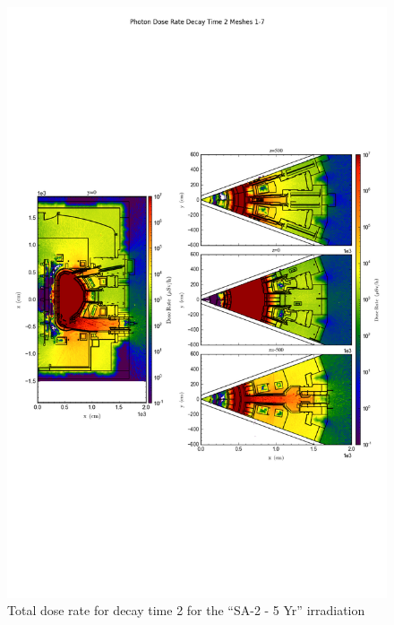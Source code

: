 \documentclass[12pt]{article}
\begin{document}
\begin{figure}[ht!]
\centering
\includegraphics[trim={0cm 8cm, 0cm 8cm},clip,scale=0.75]{../plots/final_model/10year/Photon_Dose_Rate_Decay_Time_2_Meshes_1-7.png}
\caption{Total dose rate for decay time 2 for the ``SA-2 - 5 Yr'' irradiation}
\label{fig:photons_10y_dc2_nob4c_dose}
\end{figure}
\end{document}
